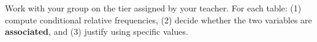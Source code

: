 \documentclass[10pt]{article}
\begin{document}
\namepartnerperiod

\vspace{0.1in}

\begin{tcolorbox}[colback=sky, colframe=navy, boxrule=0.8pt, arc=2mm,
    left=3mm, right=3mm, top=2mm, bottom=2mm]
\small
Work with your group on the tier assigned by your teacher.
For each table: (1) compute conditional relative frequencies, (2) decide whether
the two variables are \textbf{associated}, and (3) justify using specific values.
\end{tcolorbox}

\vspace{0.12in}

\end{document}
